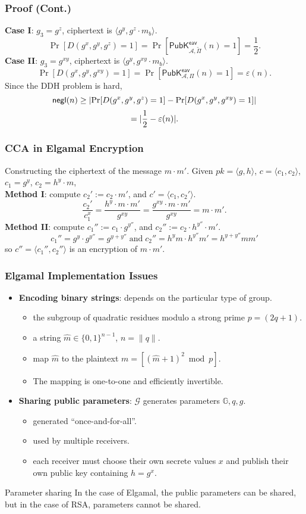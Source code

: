 \begin{frame}\frametitle{Proof (Cont.)}
\textbf{Case I}: $g_3 = g^z$, ciphertext is $\langle g^y, g^z\cdot m_b\rangle$.\\
\[ \Pr[D(g^x,g^y,g^z)=1] = \Pr\left[\mathsf{PubK}^{\mathsf{eav}}_{\mathcal{A},\tilde{\Pi}}(n)=1\right] = \frac{1}{2}.\]
\textbf{Case II}: $g_3 = g^{xy}$, ciphertext is $\langle g^y, g^{xy}\cdot m_b\rangle$.\\
\[ \Pr[D(g^x,g^y,g^{xy})=1] = \Pr\left[\mathsf{PubK}^{\mathsf{eav}}_{\mathcal{A},\Pi}(n)=1\right] = \varepsilon(n).\]
Since the DDH problem is hard,
\[  \mathsf{negl}(n) \ge \lvert\Pr[D(g^x,g^y,g^z)=1] - \Pr[D(g^x,g^y,g^{xy})=1]\rvert\]
\[ =\lvert\frac{1}{2}-\varepsilon(n)\rvert. \]
\end{frame}
\begin{frame}\frametitle{CCA in Elgamal Encryption}
\begin{exampleblock}{Constructing the ciphertext of the message $m\cdot m'$.}
Given $pk=\langle g, h\rangle$, $c = \langle c_1, c_2\rangle$, $c_1=g^y$, $c_2=h^y\cdot m$, \\ \textbf{Method I}: compute
$c_2' := c_2\cdot m'$, and $c' = \langle c_1, c_2'\rangle$.
\[\frac{c_2'}{c_1^x} = \frac{h^y\cdot m\cdot m'}{g^{xy}} = \frac{g^{xy}\cdot m\cdot m'}{g^{xy}} = m\cdot m'.\]
\textbf{Method II}: compute $c_1'' := c_1\cdot g^{y''}$, and $c_2'' := c_2\cdot h^{y''}\cdot m'$.
\[c_1''=g^y\cdot g^{y''} = g^{y+y''}\;\text{and}\; c_2''=h^ym\cdot h^{y''}m'=h^{y+y''}mm'\]
so $c''=\langle c_1'',c_2''\rangle$ is an encryption of $m\cdot m'$.
\end{exampleblock}
\end{frame}
\begin{frame}\frametitle{Elgamal Implementation Issues}
\begin{itemize}
\item \textbf{Encoding binary strings}: depends on the particular type of group.
\begin{itemize}
\item the subgroup of quadratic residues modulo a strong prime $p = (2q+1)$.
\item a string $\hat{m} \in \{0,1\}^{n-1}$, $n = \|q\|$.
\item map $\hat{m}$ to the plaintext $m = [(\hat{m}+1)^2 \bmod p]$.
\item The mapping is one-to-one and efficiently invertible.
\end{itemize}
\item \textbf{Sharing public parameters}: $\mathcal{G}$ generates parameters $\mathbb{G},q,g$.
\begin{itemize}
\item generated ``once-and-for-all''.
\item used by multiple receivers.
\item each receiver must choose their own secrete values $x$ and publish their own public key containing $h=g^x$.
\end{itemize}
\end{itemize}
\begin{alertblock}{Parameter sharing}
In the case of Elgamal, the public parameters can be shared, but in the case of RSA, parameters cannot be shared.
\end{alertblock}
\end{frame}

